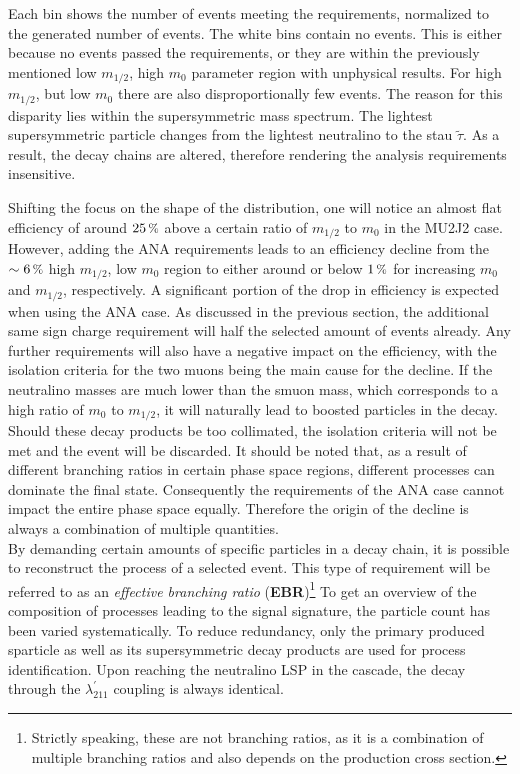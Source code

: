 \noindent Each bin shows the number of events meeting the requirements, normalized to the generated number of events. The white bins contain no events. This is either because no events passed the requirements, or they are within the previously mentioned low $m_{1/2}$, high $m_0$ parameter region with unphysical results. For high $m_{1/2}$, but low $m_0$ there are also disproportionally few events. The reason for this disparity lies within the supersymmetric mass spectrum. The lightest supersymmetric particle changes from the lightest neutralino to the stau $\tilde{\tau}$. As a result, the decay chains are altered, therefore rendering the analysis requirements insensitive. 

Shifting the focus on the shape of the distribution, one will notice an almost flat efficiency of around $25\,\pct$ above a certain ratio of $m_{1/2}$ to $m_0$ in the MU2J2 case. However, adding the ANA requirements leads to an efficiency decline from the $\sim 6\,\pct$ high $m_{1/2}$, low $m_0$ region to either around or below $1\,\pct$ for increasing $m_0$ and $m_{1/2}$, respectively. A significant portion of the drop in efficiency is expected when using the ANA case. As discussed in the previous section, the additional same sign charge requirement will half the selected amount of events already. Any further requirements will also have a negative impact on the efficiency, with the isolation criteria for the two muons being the main cause for the decline. If the neutralino masses are much lower than the smuon mass, which corresponds to a high ratio of $m_0$ to $m_{1/2}$, it will naturally lead to boosted particles in the decay. Should these decay products be too collimated, the isolation criteria will not be met and the event will be discarded. It should be noted that, as a result of different branching ratios in certain phase space regions, different processes can dominate the final state. Consequently the requirements of the ANA case cannot impact the entire phase space equally. Therefore the origin of the decline is always a combination of multiple quantities. \\

By demanding certain amounts of specific particles in a decay chain, it is possible to reconstruct the process of a selected event. This type of requirement will be referred to as an \textit{effective branching ratio} (\textbf{EBR})\footnote{Strictly speaking, these are not branching ratios, as it is a combination of multiple branching ratios and also depends on the production cross section.} To get an overview of the composition of processes leading to the signal signature, the particle count has been varied systematically. To reduce redundancy, only the primary produced sparticle as well as its supersymmetric decay products are used for process identification. Upon reaching the neutralino LSP in the cascade, the decay through the $\lambda^\prime_{211}$ coupling is always identical.

